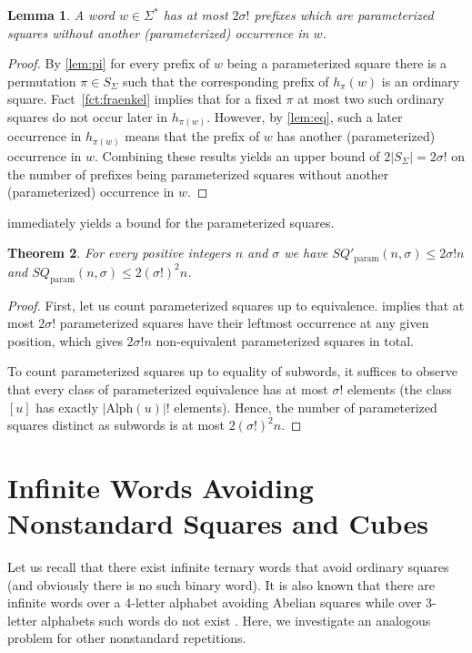 \documentclass{article}
\theoremstyle{plain}
\newtheorem{theorem}{Theorem}[section]
\newtheorem{lemma}[theorem]{Lemma}
\theoremstyle{definition}
\theoremstyle{remark}
\newcommand{\SQ}{\mathit{SQ}}
\renewcommand{\Alph}{\mathrm{Alph}}
\newcommand{\SQPARAM}{\SQ_{\mathrm{param}}}
\newcommand{\SQPPARAM}{\SQ'_{\mathrm{param}}}
\begin{document}
\begin{lemma}\label{lem:factorial}
A word $w\in \Sigma^*$ has at most $2\sigma!$ prefixes which are parameterized squares
without another (parameterized) occurrence in $w$.
\end{lemma}
\begin{proof}
By \cref{lem:pi} for every prefix of $w$ being a parameterized square there is a permutation $\pi\in S_{\Sigma}$
such that the corresponding prefix of $h_\pi(w)$ is an ordinary square. Fact~\ref{fct:fraenkel} implies
that for a fixed $\pi$ at most two such ordinary squares do not occur later in $h_{\pi(w)}$. However,
by \cref{lem:eq}, such a later occurrence in $h_{\pi(w)}$ means that the prefix of $w$ has
another (parameterized) occurrence in $w$. Combining these results yields an upper bound of $2|S_{\Sigma}|=2\sigma!$
on the number of prefixes being parameterized squares
without another (parameterized) occurrence in $w$.
\end{proof}

 immediately yields a bound for the parameterized squares.

\begin{theorem}
For every positive integers $n$ and $\sigma$ we have 
    $\SQPPARAM(n,\sigma) \le 2\sigma!n$ 
    and $\SQPARAM(n,\sigma)\le 2(\sigma!)^2n$.
\end{theorem} 
\begin{proof}
First, let us count parameterized squares up to equivalence.
 implies that at most $2\sigma!$ parameterized squares have their leftmost occurrence
at any given position, which gives $2\sigma!n$ non-equivalent parameterized squares in total.

To count parameterized squares up to equality of subwords, it suffices to observe that
every class of parameterized equivalence has at most $\sigma!$ elements (the class $[u]$ has exactly $|\Alph(u)|!$ elements).
Hence, the number of parameterized squares distinct as subwords is at most $2(\sigma!)^2n$. 
\end{proof}


\section{Infinite Words Avoiding Nonstandard Squares and Cubes}\label{sec:infinite}
  Let us recall that there exist infinite ternary words that avoid ordinary squares \cite{Thue}
  (and obviously there is no such binary word).
  It is also known that there are infinite words over a 4-letter alphabet avoiding Abelian squares
  while over 3-letter alphabets such words do not exist \cite{DBLP:conf/icalp/Keranen92}.
  Here, we investigate an analogous problem for other nonstandard repetitions.
\end{document}
